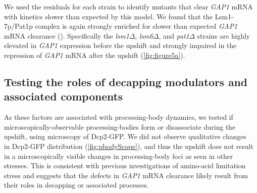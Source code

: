 We used the residuals for each
strain to identify mutants that clear \textit{GAP1} mRNA with kinetics slower
than expected by this model.
We found that the Lsm1-7p/Pat1p complex is again strongly 
enriched for slower than
expected \textit{GAP1} mRNA clearance (). 
Specifically
the \textit{lsm1}$\Delta$, \textit{lsm6}$\Delta$, and 
\textit{pat1}$\Delta$ strains are highly elevated in \textit{GAP1}
expression before the upshift and strongly impaired in the 
repression of \textit{GAP1} mRNA after the upshift
(\autoref{fig:figure5a}). 


\subsection{Testing the roles of decapping modulators and associated
components}

As these factors are associated with processing-body dynamics, 
we tested if microscopically-observable processing-bodies form or
disassociate during the upshift, using microscopy of Dcp2-GFP. 
We did not observe qualitative changes
in Dcp2-GFP distribution (\autoref{fig:pbodyScope}),
and thus the upshift does not
result in a microscopically visible changes in processing-body foci
as seen in other stresses. This is consistent with previous
investigations of amino-acid limitation stress
\parencite{hoyle2007stress} and
suggests that the defects in \textit{GAP1} mRNA clearance likely 
result from their roles in decapping or associated processes.


